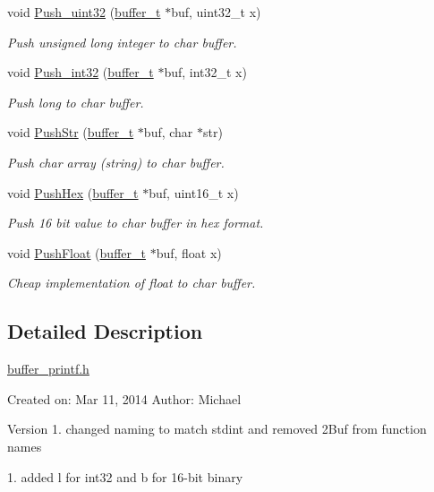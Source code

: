 \begin{DoxyCompactItemize}
void \hyperlink{group__buffer__printf_gac138be24ecf405d8efaf1311cecc6f8b}{Push\+\_\+uint32} (\hyperlink{structbuffer__t}{buffer\+\_\+t} $\ast$buf, uint32\+\_\+t x)
\begin{DoxyCompactList}\small\item\em Push unsigned long integer to char buffer. \end{DoxyCompactList}\item 
void \hyperlink{group__buffer__printf_ga6dade9cec52d66a03fb17f1e7473c912}{Push\+\_\+int32} (\hyperlink{structbuffer__t}{buffer\+\_\+t} $\ast$buf, int32\+\_\+t x)
\begin{DoxyCompactList}\small\item\em Push long to char buffer. \end{DoxyCompactList}\item 
void \hyperlink{group__buffer__printf_ga542a3f217761e35cd7067f468e667495}{Push\+Str} (\hyperlink{structbuffer__t}{buffer\+\_\+t} $\ast$buf, char $\ast$str)
\begin{DoxyCompactList}\small\item\em Push char array (string) to char buffer. \end{DoxyCompactList}\item 
void \hyperlink{group__buffer__printf_gab6d3d9b051da3fc0e7f989b1d20d7acd}{Push\+Hex} (\hyperlink{structbuffer__t}{buffer\+\_\+t} $\ast$buf, uint16\+\_\+t x)
\begin{DoxyCompactList}\small\item\em Push 16 bit value to char buffer in hex format. \end{DoxyCompactList}\item 
void \hyperlink{group__buffer__printf_gab855c78568480d35865d7a4dc92e3ddc}{Push\+Float} (\hyperlink{structbuffer__t}{buffer\+\_\+t} $\ast$buf, float x)
\begin{DoxyCompactList}\small\item\em Cheap implementation of float to char buffer. \end{DoxyCompactList}\end{DoxyCompactItemize}


\subsection{Detailed Description}
\hyperlink{buffer__printf_8h}{buffer\+\_\+printf.\+h}

Created on\+: Mar 11, 2014 Author\+: Michael

\begin{DoxyVersion}{Version}
1. changed naming to match stdint and removed 2\+Buf from function names 

1. added l for int32 and b for 16-\/bit binary 
\end{DoxyVersion}


